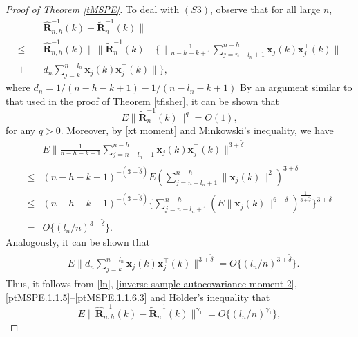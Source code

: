 \documentclass[ejsv2]{imsart}
\theoremstyle{plain}
\theoremstyle{definition}
\theoremstyle{remark}
\begin{document}
\begin{proof}[Proof of Theorem \ref{tMSPE}]
{To deal with $(S3)$, observe that for all large $n$,
\begin{equation}\label{ptMSPE.1.1.5}
\begin{split}
  & \lVert\hat{\mathbf{R}}_{n,h}^{-1}(k)-\tilde{\mathbf{R}}_n^{-1}(k)\rVert \\
  \leq & \lVert\hat{\mathbf{R}}_{n,h}^{-1}(k)\rVert\lVert\tilde{\mathbf{R}}_n^{-1}(k)\rVert\{\lVert\frac{1}{n-h-k+1}\sum_{j=n-l_n+1}^{n-h}\mathbf{x}_j(k)\mathbf{x}_j^\top(k)\rVert\\
    +&\lVert d_n\sum_{j=k}^{n-l_n}\mathbf{x}_j(k)\mathbf{x}_j^\top(k)\rVert\},
\end{split}
\end{equation}
where $d_n=1/(n-h-k+1)-1/(n-l_n-k+1)$
By an argument similar to that used in the proof of Theorem \ref{tfisher}, it can be shown that
\begin{equation}\label{ptMSPE.1.1.6}
E\lVert\tilde{\mathbf{R}}_n^{-1}(k)\rVert^{q}=O(1),
\end{equation}
for any $q>0$. Moreover, by \eqref{xt moment} and Minkowski's inequality, we have
\begin{equation}\label{ptMSPE.1.1.6.2}
\begin{split}
     & E\lVert\frac{1}{n-h-k+1}\sum_{j=n-l_n+1}^{n-h}\mathbf{x}_j(k)\mathbf{x}_j^\top(k)\rVert^{3+\tilde{\delta}} \\
    \leq & (n-h-k+1)^{-(3+\tilde{\delta})}E(\sum_{j=n-l_n+1}^{n-h}\lVert\mathbf{x}_j(k)\rVert^2)^{3+\tilde{\delta}}\\
    \leq & (n-h-k+1)^{-(3+\tilde{\delta})}\{\sum_{j=n-l_n+1}^{n-h}(E\lVert\mathbf{x}_j(k)\rVert^{6+\delta})^{\frac{1}{3+\tilde{\delta}}}\}^{3+\tilde{\delta}}\\
    =&O\{(l_n/n)^{3+\tilde{\delta}}\}.
\end{split}
\end{equation}
Analogously, it can be shown that
\begin{align}\label{ptMSPE.1.1.6.3}
\begin{split}
     & E\lVert d_n\sum_{j=k}^{n-l_n}\mathbf{x}_j(k)\mathbf{x}_j^\top(k)\rVert^{3+\tilde{\delta}}
     =O\{(l_n/n)^{3+\tilde{\delta}}\}.
\end{split}
\end{align}
Thus, it follows from \eqref{ln}, \eqref{inverse sample autocovariance moment 2}, \eqref{ptMSPE.1.1.5}--\eqref{ptMSPE.1.1.6.3} and H$\ddot{\mathrm{o}}$lder's inequality that
\begin{equation}\label{ptMSPE.1.1.7}
E\lVert\hat{\mathbf{R}}_{n,h}^{-1}(k)-\tilde{\mathbf{R}}_n^{-1}(k)\rVert^{\gamma_1}=O\{(l_n/n)^{\gamma_1}\},

\end{equation}}
\end{proof}
\end{document}

